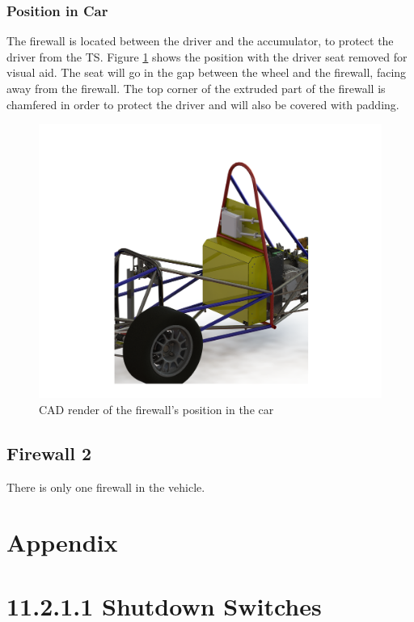 \documentclass{article}
\begin{document}
        \subsubsection{Position in Car}

            The firewall is located between the driver and the accumulator, to protect the driver from the TS. Figure \ref{firewallposition} shows the position with the driver seat removed for visual aid. The seat will go in the gap between the wheel and the firewall, facing away from the firewall. The top corner of the extruded part of the firewall is chamfered in order to protect the driver and will also be covered with padding.

            \begin{figure}[H]
                \centering
                \includegraphics[width = 0.8 \textwidth]{FirewallFullCarView}
                \caption{CAD render of the firewall's position in the car}
                \label{firewallposition}
            \end{figure}

    \subsection{Firewall 2}
        There is only one firewall in the vehicle.

\newpage

\section{Appendix}
\section*{11.2.1.1 Shutdown Switches} \label{shutdownappendix}
\end{document}

